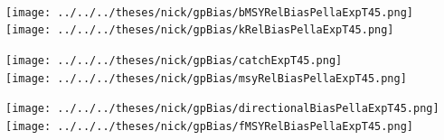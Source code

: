 \documentclass[ xcolor = pdftex, dvipsnames, table ]{beamer}
\begin{document}
{%
\begin{frame}%
$~$
\hspace*{-1.25cm}
\begin{minipage}[h!]{0.33\textwidth}
\hspace*{0.25cm}
\texttt{[image: ../../../theses/nick/gpBias/bMSYRelBiasPellaExpT45.png]}\\
\hspace*{0.25cm}
\texttt{[image: ../../../theses/nick/gpBias/kRelBiasPellaExpT45.png]}
\end{minipage}
\begin{minipage}[h!]{0.33\textwidth}
\hspace*{0.75cm}
\texttt{[image: ../../../theses/nick/gpBias/catchExpT45.png]}\\
\hspace*{0.75cm}
\texttt{[image: ../../../theses/nick/gpBias/msyRelBiasPellaExpT45.png]}
\end{minipage}
\begin{minipage}[h!]{0.33\textwidth}
\hspace*{1cm}
\texttt{[image: ../../../theses/nick/gpBias/directionalBiasPellaExpT45.png]}\\
\hspace*{1cm}
\texttt{[image: ../../../theses/nick/gpBias/fMSYRelBiasPellaExpT45.png]}
\end{minipage}
\end{frame}

}
\end{document}
